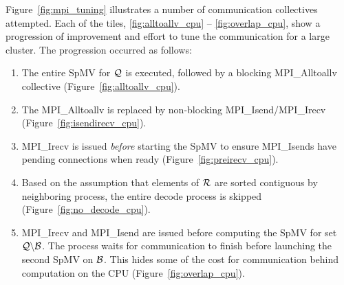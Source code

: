 \documentclass{report}
\begin{document}
Figure~\ref{fig:mpi_tuning} illustrates a number of communication collectives attempted. Each of the tiles, \ref{fig:alltoallv_cpu} -- \ref{fig:overlap_cpu}, show a progression of improvement and effort to tune the communication for a large cluster. The progression occurred as follows:  
\begin{enumerate} 
\item The entire SpMV for $\mathcal{Q}$ is executed, followed by a blocking MPI\_Alltoallv collective (Figure~\ref{fig:alltoallv_cpu}).
\item The MPI\_Alltoallv is replaced by non-blocking MPI\_Isend/MPI\_Irecv (Figure~\ref{fig:isendirecv_cpu}).
\item MPI\_Irecv is issued \emph{before} starting the SpMV to ensure MPI\_Isends have pending connections when ready (Figure~\ref{fig:preirecv_cpu}). 
\item Based on the assumption that elements of $\mathcal{R}$ are sorted contiguous by neighboring process, the entire decode process is skipped (Figure~\ref{fig:no_decode_cpu}). 
\item MPI\_Irecv and MPI\_Isend are issued before computing the SpMV for set $\mathcal{Q} \backslash \mathcal{B}$. The process waits for communication to finish before launching the second SpMV on $\mathcal{B}$. This hides some of the cost for communication behind computation on the CPU (Figure~\ref{fig:overlap_cpu}). 
\end{enumerate}
\end{document}
